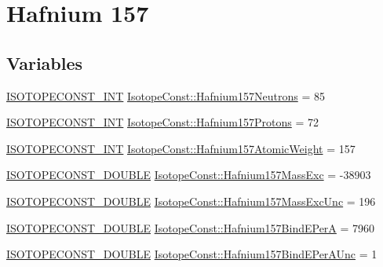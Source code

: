\hypertarget{group___isotope_const-_hafnium-_hf157}{}\section{Hafnium 157}
\label{group___isotope_const-_hafnium-_hf157}
\subsection*{Variables}
\begin{DoxyCompactItemize}
\item 
\mbox{\hyperlink{group___isotope_const-_macros_ga5f18360b3e99483a35c32d789e62621c}{I\+S\+O\+T\+O\+P\+E\+C\+O\+N\+S\+T\+\_\+\+I\+NT}} \mbox{\hyperlink{group___isotope_const-_hafnium-_hf157_ga3ffb6a9311e1459bdc076231ec0cc44f}{Isotope\+Const\+::\+Hafnium157\+Neutrons}} = 85
\item 
\mbox{\hyperlink{group___isotope_const-_macros_ga5f18360b3e99483a35c32d789e62621c}{I\+S\+O\+T\+O\+P\+E\+C\+O\+N\+S\+T\+\_\+\+I\+NT}} \mbox{\hyperlink{group___isotope_const-_hafnium-_hf157_ga42deb4c9eaf96e8ef2cc5c06abb8df67}{Isotope\+Const\+::\+Hafnium157\+Protons}} = 72
\item 
\mbox{\hyperlink{group___isotope_const-_macros_ga5f18360b3e99483a35c32d789e62621c}{I\+S\+O\+T\+O\+P\+E\+C\+O\+N\+S\+T\+\_\+\+I\+NT}} \mbox{\hyperlink{group___isotope_const-_hafnium-_hf157_gaeac79036be25de634ce83c05e13675c1}{Isotope\+Const\+::\+Hafnium157\+Atomic\+Weight}} = 157
\item 
\mbox{\hyperlink{group___isotope_const-_macros_ga8f45a7272ce02c0b4c65c44636ed719a}{I\+S\+O\+T\+O\+P\+E\+C\+O\+N\+S\+T\+\_\+\+D\+O\+U\+B\+LE}} \mbox{\hyperlink{group___isotope_const-_hafnium-_hf157_ga59076c0a175196e11368f12f6725a62e}{Isotope\+Const\+::\+Hafnium157\+Mass\+Exc}} = -\/38903
\item 
\mbox{\hyperlink{group___isotope_const-_macros_ga8f45a7272ce02c0b4c65c44636ed719a}{I\+S\+O\+T\+O\+P\+E\+C\+O\+N\+S\+T\+\_\+\+D\+O\+U\+B\+LE}} \mbox{\hyperlink{group___isotope_const-_hafnium-_hf157_gaf3812f948d065a57d789c9e6fe97e766}{Isotope\+Const\+::\+Hafnium157\+Mass\+Exc\+Unc}} = 196
\item 
\mbox{\hyperlink{group___isotope_const-_macros_ga8f45a7272ce02c0b4c65c44636ed719a}{I\+S\+O\+T\+O\+P\+E\+C\+O\+N\+S\+T\+\_\+\+D\+O\+U\+B\+LE}} \mbox{\hyperlink{group___isotope_const-_hafnium-_hf157_ga2174fbc34a0c6d89a85d1f4e90017909}{Isotope\+Const\+::\+Hafnium157\+Bind\+E\+PerA}} = 7960
\item 
\mbox{\hyperlink{group___isotope_const-_macros_ga8f45a7272ce02c0b4c65c44636ed719a}{I\+S\+O\+T\+O\+P\+E\+C\+O\+N\+S\+T\+\_\+\+D\+O\+U\+B\+LE}} \mbox{\hyperlink{group___isotope_const-_hafnium-_hf157_gaa68fea4840a095bd4322d5a6c5daecb4}{Isotope\+Const\+::\+Hafnium157\+Bind\+E\+Per\+A\+Unc}} = 1

\end{DoxyCompactItemize}
